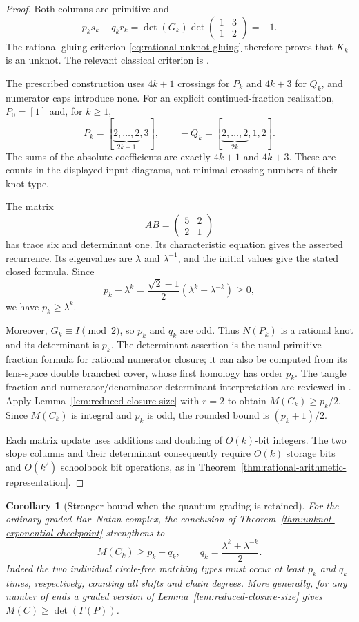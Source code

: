 \documentclass[11pt,a4paper]{article}
\newtheorem{corollary}[theorem]{Corollary}
\theoremstyle{definition}
\theoremstyle{remark}
\numberwithin{equation}{section}
\begin{document}
\begin{proof}
Both columns are primitive and
\[
 p_ks_k-q_kr_k
 =\det(G_k)\det\begin{pmatrix}1&3\\1&2\end{pmatrix}
 =-1.
\]
The rational gluing criterion
\eqref{eq:rational-unknot-gluing} therefore proves that $K_k$ is an
unknot.  The relevant classical criterion is
\cite[Theorem~5]{KauffmanLambropoulouHard}.

The prescribed construction uses $4k+1$ crossings for $P_k$ and
$4k+3$ for $Q_k$, and numerator caps introduce none.
For an explicit continued-fraction realization, $P_0=[1]$ and, for
$k\ge1$,
\[
 P_k=[\underbrace{2,\ldots,2}_{2k-1},3],
 \qquad
 -Q_k=[\underbrace{2,\ldots,2}_{2k},1,2].
\]
The sums of the absolute coefficients are exactly $4k+1$ and
$4k+3$.  These are counts in the displayed input diagrams, not
minimal crossing numbers of their knot type.

The matrix
\[
 AB=\begin{pmatrix}5&2\\2&1\end{pmatrix}
\]
has trace six and determinant one.  Its characteristic equation
gives the asserted recurrence.  Its eigenvalues are
$\lambda$ and $\lambda^{-1}$, and the initial values give the stated
closed formula.  Since
\[
 p_k-\lambda^k
 =\frac{\sqrt2-1}{2}(\lambda^k-\lambda^{-k})\ge0,
\]
we have $p_k\ge\lambda^k$.

Moreover, $G_k\equiv I\pmod2$, so $p_k$ and $q_k$ are odd.
Thus $N(P_k)$ is a rational knot and its determinant is $p_k$.
The determinant assertion is the usual primitive fraction formula
for rational numerator closure; it can also be computed from its
lens-space double branched cover, whose first homology has order
$p_k$.  The tangle fraction and numerator/denominator determinant
interpretation are reviewed in
\cite[Section~4.1, Remark~2]{KauffmanLambropoulouFractions}.
Apply Lemma~\ref{lem:reduced-closure-size} with $r=2$ to obtain
$M(C_k)\ge p_k/2$.  Since $M(C_k)$ is integral and $p_k$ is odd, the
rounded bound is $(p_k+1)/2$.

Each matrix update uses additions and doubling of $O(k)$-bit
integers.  The two slope columns and their determinant consequently
require $O(k)$ storage bits and $O(k^2)$ schoolbook bit operations,
as in Theorem~\ref{thm:rational-arithmetic-representation}.
\end{proof}

\begin{corollary}[Stronger bound when the quantum grading is retained]
\label{cor:graded-checkpoint-size}
For the ordinary graded Bar--Natan complex, the conclusion of
Theorem~\ref{thm:unknot-exponential-checkpoint} strengthens to
\[
 M(C_k)\ge p_k+q_k,
 \qquad q_k=\frac{\lambda^k+\lambda^{-k}}2.
\]
Indeed the two individual circle-free matching types must occur at
least $p_k$ and $q_k$ times, respectively, counting all shifts and
chain degrees.  More generally, for any number of ends a graded
version of Lemma~\ref{lem:reduced-closure-size} gives
$M(C)\ge\det(\Gamma(P))$.
\end{corollary}
\end{document}
